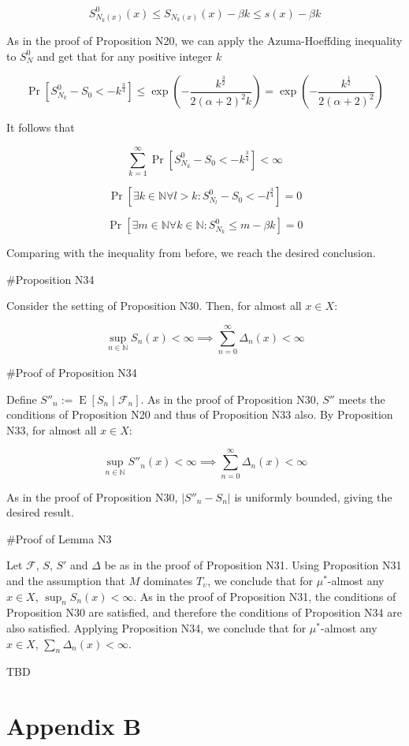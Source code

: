 \documentclass[a4paper]{article}
\DeclareMathOperator{\E}{E}
\newcommand{\Nats}{\mathbb{N}}
\newcommand{\Abs}[1]{\lvert #1 \rvert}
\newcommand{\F}{\mathcal{F}}
\begin{document}
$$S^0_{N_k(x)}(x) \leq S_{N_k(x)}(x) - \beta k \leq s(x) - \beta k$$

As in the proof of Proposition N20, we can apply the Azuma-Hoeffding inequality to $S^0_N$ and get that for any positive integer $k$

$$\Pr[S^0_{N_k} - S_0 < -k^{\frac{3}{4}}] \leq \exp(-\frac{k^{\frac{3}{2}}}{2(\alpha + 2)^2k})=\exp(-\frac{k^{\frac{1}{2}}}{2(\alpha + 2)^2})$$

It follows that

$$\sum_{k=1}^\infty \Pr[S^0_{N_k} - S_0 < -k^{\frac{3}{4}}] < \infty$$

$$\Pr[\exists k \in \Nats \forall l > k: S^0_{N_l} - S_0 < -l^{\frac{3}{4}}] = 0$$

$$\Pr[\exists m \in \Nats \forall k \in \Nats: S^0_{N_k} \leq m - \beta k] = 0$$

Comparing with the inequality from before, we reach the desired conclusion.

\#Proposition N34

Consider the setting of Proposition N30. Then, for almost all $x \in X$:

$$\sup_{n \in \Nats} S_n(x) < \infty \implies \sum_{n = 0}^\infty \Delta_n(x) < \infty$$

\#Proof of Proposition N34

Define $S''_n:=\E[S_n \mid \F_n]$. As in the proof of Proposition N30, $S''$ meets the conditions of Proposition N20 and thus of Proposition N33 also. By Proposition N33, for almost all $x \in X$:

$$\sup_{n \in \Nats} S''_n(x) < \infty \implies \sum_{n = 0}^\infty \Delta_n(x) < \infty$$

As in the proof of Proposition N30, $\Abs{S''_n-S_n}$ is uniformly bounded, giving the desired result.

\#Proof of Lemma N3

Let $\F$, $S$, $S'$ and $\Delta$ be as in the proof of Proposition N31. Using Proposition N31 and the assumption that $M$ dominates $T_\upsilon$, we conclude that for $\mu^*$-almost any $x \in X$, $\sup_n S_n(x) < \infty$. As in the proof of Proposition N31, the conditions of Proposition N30 are satisfied, and therefore the conditions of Proposition N34 are also satisfied. Applying Proposition N34, we conclude that for $\mu^*$-almost any $x \in X$, $\sum_n \Delta_n(x) < \infty$.

TBD

\section{Appendix B}
\end{document}
